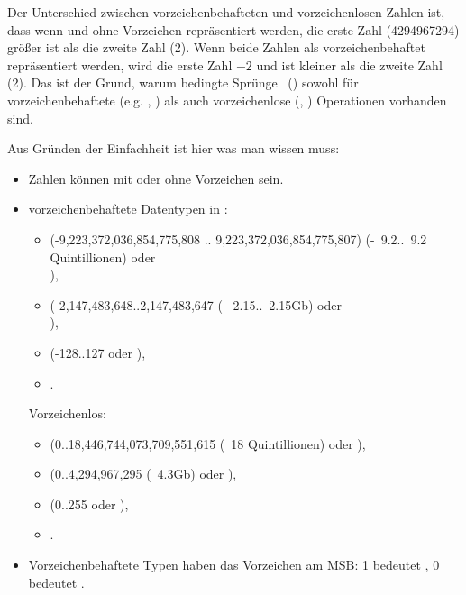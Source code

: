Der Unterschied zwischen vorzeichenbehafteten und vorzeichenlosen Zahlen ist, dass wenn 
und  ohne Vorzeichen repräsentiert werden, die erste Zahl (4294967294) größer ist als
die zweite Zahl (2).
Wenn beide Zahlen als vorzeichenbehaftet repräsentiert werden, wird die erste Zahl $-2$ und ist kleiner
als die zweite Zahl (2).
Das ist der Grund, warum bedingte Sprünge ~() sowohl für vorzeichenbehaftete (e.g. \JG, \JL)
als auch vorzeichenlose (\JA, \JB) Operationen vorhanden sind.

Aus Gründen der Einfachheit ist hier was man wissen muss:

\begin{itemize}
\item Zahlen können mit oder ohne Vorzeichen sein.

\item vorzeichenbehaftete Datentypen in \CCpp:

  \begin{itemize}
    \item {} (-9,223,372,036,854,775,808 .. 9,223,372,036,854,775,807)
	  (-~9.2..~9.2 Quintillionen) oder \\
                ),
    \item \Tint (-2,147,483,648..2,147,483,647 (-~2.15..~2.15Gb) oder \\
	    ),
    \item \Tchar (-128..127 oder ),
    \item {}.
   \end{itemize}

	Vorzeichenlos:
  \begin{itemize}
	  \item {} (0..18,446,744,073,709,551,615 
		  (~18 Quintillionen) oder ),
   \item {} (0..4,294,967,295 (~4.3Gb) oder ),
   \item {} (0..255 oder ), 
   \item {}.
  \end{itemize}

\item Vorzeichenbehaftete Typen haben das Vorzeichen am \ac{MSB}: 1 bedeutet , 0 bedeutet .


\end{itemize}
